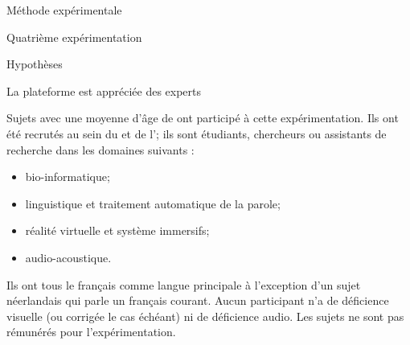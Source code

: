 \documentclass[myfrancais,ngerman,english,french]{mythesis}
\begin{document}
\begin{mychapter}{Méthode expérimentale}
\begin{mysection}{Quatrième expérimentation}
\begin{mysubsection}{Hypothèses}
\begin{myparagraph}{ La plateforme est appréciée des experts}
				\end{myparagraph}
			\end{mysubsection}
			\begin{mysubsection}{Sujets}
				 avec une moyenne d'âge de  ont participé à cette expérimentation.
				Ils ont été recrutés au sein du \myCNRSLIMSI et de l'; ils sont étudiants, chercheurs ou assistants de recherche dans les domaines suivants :
				\begin{itemize}
					\item bio-informatique;
					\item linguistique et traitement automatique de la parole;
					\item réalité virtuelle et système immersifs;
					\item audio-acoustique.
				\end{itemize}
				Ils ont tous le français comme langue principale à l'exception d'un sujet néerlandais qui parle un français courant.
				Aucun participant n'a de déficience visuelle (ou corrigée le cas échéant) ni de déficience audio.
				Les sujets ne sont pas rémunérés pour l'expérimentation.


\end{mysubsection}
\end{mysection}
\end{mychapter}
\end{document}
